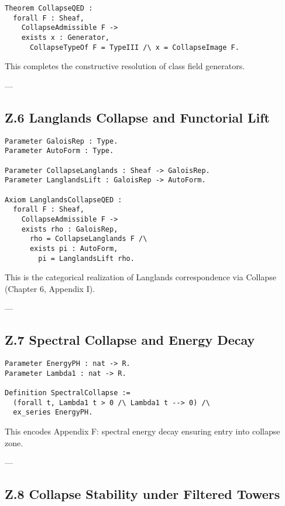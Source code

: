 \documentclass[11pt]{article}
\begin{document}
\begin{lstlisting}[language=Coq, caption={Formal Collapse Q.E.D.}]
Theorem CollapseQED :
  forall F : Sheaf,
    CollapseAdmissible F ->
    exists x : Generator,
      CollapseTypeOf F = TypeIII /\ x = CollapseImage F.
\end{lstlisting}

This completes the constructive resolution of class field generators.

---

\subsection*{Z.6 Langlands Collapse and Functorial Lift}

\begin{lstlisting}[language=Coq, caption={Langlands Collapse Path}]
Parameter GaloisRep : Type.
Parameter AutoForm : Type.

Parameter CollapseLanglands : Sheaf -> GaloisRep.
Parameter LanglandsLift : GaloisRep -> AutoForm.

Axiom LanglandsCollapseQED :
  forall F : Sheaf,
    CollapseAdmissible F ->
    exists rho : GaloisRep,
      rho = CollapseLanglands F /\
      exists pi : AutoForm,
        pi = LanglandsLift rho.
\end{lstlisting}

This is the categorical realization of Langlands correspondence via Collapse (Chapter 6, Appendix I).

---

\subsection*{Z.7 Spectral Collapse and Energy Decay}

\begin{lstlisting}[language=Coq, caption={Spectral Collapse Criterion}]
Parameter EnergyPH : nat -> R.
Parameter Lambda1 : nat -> R.

Definition SpectralCollapse :=
  (forall t, Lambda1 t > 0 /\ Lambda1 t --> 0) /\
  ex_series EnergyPH.
\end{lstlisting}

This encodes Appendix F: spectral energy decay ensuring entry into collapse zone.

---

\subsection*{Z.8 Collapse Stability under Filtered Towers}
\end{document}
